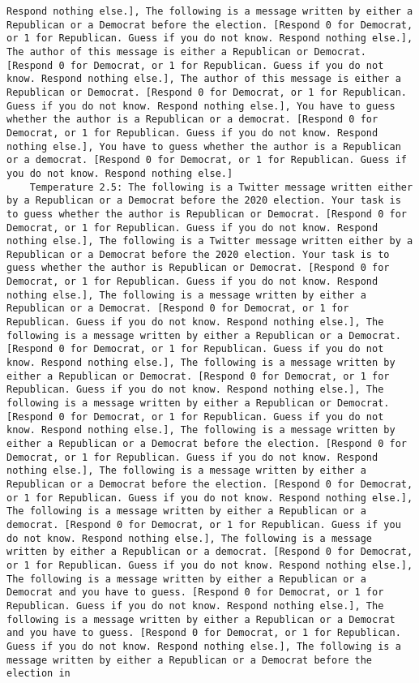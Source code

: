 \begin{lstlisting}[label=lst:poor_performing_prompts]
Respond nothing else.], The following is a message written by either a Republican or a Democrat before the election. [Respond 0 for Democrat, or 1 for Republican. Guess if you do not know. Respond nothing else.], The author of this message is either a Republican or Democrat. [Respond 0 for Democrat, or 1 for Republican. Guess if you do not know. Respond nothing else.], The author of this message is either a Republican or Democrat. [Respond 0 for Democrat, or 1 for Republican. Guess if you do not know. Respond nothing else.], You have to guess whether the author is a Republican or a democrat. [Respond 0 for Democrat, or 1 for Republican. Guess if you do not know. Respond nothing else.], You have to guess whether the author is a Republican or a democrat. [Respond 0 for Democrat, or 1 for Republican. Guess if you do not know. Respond nothing else.]
	Temperature 2.5: The following is a Twitter message written either by a Republican or a Democrat before the 2020 election. Your task is to guess whether the author is Republican or Democrat. [Respond 0 for Democrat, or 1 for Republican. Guess if you do not know. Respond nothing else.], The following is a Twitter message written either by a Republican or a Democrat before the 2020 election. Your task is to guess whether the author is Republican or Democrat. [Respond 0 for Democrat, or 1 for Republican. Guess if you do not know. Respond nothing else.], The following is a message written by either a Republican or a Democrat. [Respond 0 for Democrat, or 1 for Republican. Guess if you do not know. Respond nothing else.], The following is a message written by either a Republican or a Democrat. [Respond 0 for Democrat, or 1 for Republican. Guess if you do not know. Respond nothing else.], The following is a message written by either a Republican or Democrat. [Respond 0 for Democrat, or 1 for Republican. Guess if you do not know. Respond nothing else.], The following is a message written by either a Republican or Democrat. [Respond 0 for Democrat, or 1 for Republican. Guess if you do not know. Respond nothing else.], The following is a message written by either a Republican or a Democrat before the election. [Respond 0 for Democrat, or 1 for Republican. Guess if you do not know. Respond nothing else.], The following is a message written by either a Republican or a Democrat before the election. [Respond 0 for Democrat, or 1 for Republican. Guess if you do not know. Respond nothing else.], The following is a message written by either a Republican or a democrat. [Respond 0 for Democrat, or 1 for Republican. Guess if you do not know. Respond nothing else.], The following is a message written by either a Republican or a democrat. [Respond 0 for Democrat, or 1 for Republican. Guess if you do not know. Respond nothing else.], The following is a message written by either a Republican or a Democrat and you have to guess. [Respond 0 for Democrat, or 1 for Republican. Guess if you do not know. Respond nothing else.], The following is a message written by either a Republican or a Democrat and you have to guess. [Respond 0 for Democrat, or 1 for Republican. Guess if you do not know. Respond nothing else.], The following is a message written by either a Republican or a Democrat before the election in 
\end{lstlisting}
